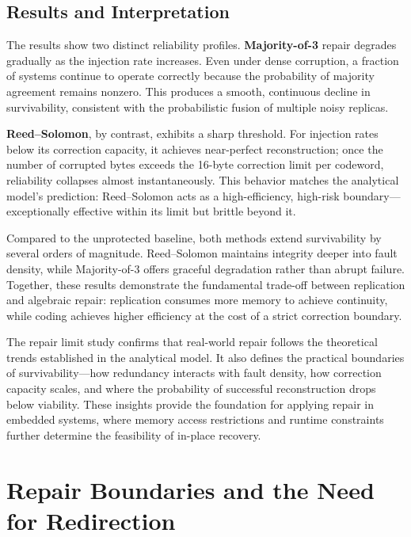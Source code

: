 \subsection{Results and Interpretation}
\label{subsec:ch3-limit-results}

The results show two distinct reliability profiles.  
\textbf{Majority-of-3} repair degrades gradually as the injection rate increases.  
Even under dense corruption, a fraction of systems continue to operate correctly because the probability of majority agreement remains nonzero.  
This produces a smooth, continuous decline in survivability, consistent with the probabilistic fusion of multiple noisy replicas.

\textbf{Reed--Solomon}, by contrast, exhibits a sharp threshold.  
For injection rates below its correction capacity, it achieves near-perfect reconstruction; once the number of corrupted bytes 
exceeds the 16-byte correction limit per codeword, reliability collapses almost instantaneously.  
This behavior matches the analytical model’s prediction: Reed--Solomon acts as a high-efficiency, high-risk boundary—
exceptionally effective within its limit but brittle beyond it.

Compared to the unprotected baseline, both methods extend survivability by several orders of magnitude.  
Reed--Solomon maintains integrity deeper into fault density, while Majority-of-3 offers graceful degradation rather than abrupt failure.  
Together, these results demonstrate the fundamental trade-off between replication and algebraic repair:  
replication consumes more memory to achieve continuity, while coding achieves higher efficiency at the cost of a strict correction boundary.

The repair limit study confirms that real-world repair follows the theoretical trends established in the analytical model.  
It also defines the practical boundaries of survivability—how redundancy interacts with fault density, how correction capacity scales, 
and where the probability of successful reconstruction drops below viability.  
These insights provide the foundation for applying repair in embedded systems, 
where memory access restrictions and runtime constraints further determine the feasibility of in-place recovery.

\section*{Repair Boundaries and the Need for Redirection}

